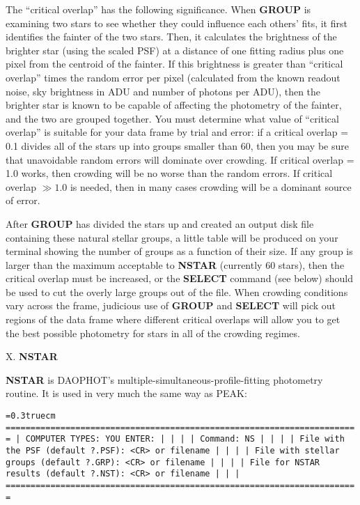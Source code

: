 \noindent The ``critical overlap'' has the following significance.
When {\bf GROUP} is examining two stars to see whether they could
influence each others' fits, it first identifies the fainter of the two
stars.  Then, it calculates the brightness of the brighter star (using
the scaled PSF) at a distance of one fitting radius plus one pixel from
the centroid of the fainter. If this brightness is greater than
``critical overlap'' times the random error per pixel (calculated from
the known readout noise, sky brightness in ADU and number of photons
per ADU), then the brighter star is known to be capable of affecting
the photometry of the fainter, and the two are grouped together.  You
must determine what value of ``critical overlap'' is suitable for your
data frame by trial and error:  if a critical overlap = 0.1 divides all
of the stars up into groups smaller than 60, then you may be sure that
unavoidable random errors will dominate over crowding.  If critical
overlap = 1.0 works, then crowding will be no worse than the random
errors.  If critical overlap $\gg  1.0$ is needed, then in many cases
crowding will be a dominant source of error.

After {\bf GROUP} has divided the stars up and created an output disk
file containing these natural stellar groups, a little table will be
produced on your terminal showing the number of groups as a function of
their size.  If any group is larger than the maximum acceptable to {\bf
NSTAR} (currently 60 stars), then the critical overlap must be
increased, or the {\bf SELECT} command (see below) should be used to
cut the overly large groups out of the file.  When crowding conditions
vary across the frame, judicious use of {\bf GROUP} and {\bf SELECT}
will pick out regions of the data frame where different critical
overlaps will allow you to get the best possible photometry for stars
in all of the crowding regimes.

\vfill
\eject
\noindent X.  {\bf NSTAR}

{\bf NSTAR} is DAOPHOT's multiple-simultaneous-profile-fitting
photometry routine. It is used in very much the same way as PEAK:

\bigskip
{\noindent\obeylines\obeyspaces\frenchspacing\tt\baselineskip=0.3truecm
=======================================================================
| COMPUTER TYPES:                                  YOU ENTER:         |
|                                                                     |
| Command:                                         NS                 |
|                                                                     |
|             File with the PSF (default ?.PSF):   <CR> or filename   |
|                                                                     |
|      File with stellar groups (default ?.GRP):   <CR> or filename   |
|                                                                     |
|        File for NSTAR results (default ?.NST):   <CR> or filename   |
|                                                                     |
=======================================================================
}
\bigskip

